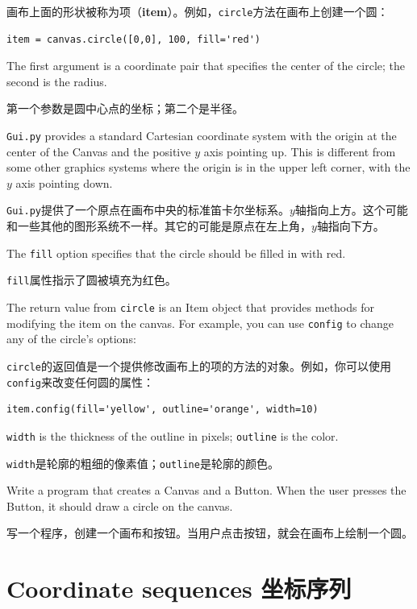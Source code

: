 \documentclass[10pt]{book}
\begin{document}
\begin{CJK}{UTF8}{gbsn}
画布上面的形状被称为项（{\bf item}）。例如，{\tt circle}方法在画布上创建一个圆：

\begin{verbatim}
item = canvas.circle([0,0], 100, fill='red')
\end{verbatim}
%
The first argument is a coordinate pair that specifies the
center of the circle; the second is the radius.

第一个参数是圆中心点的坐标；第二个是半径。

{\tt Gui.py} provides a standard Cartesian coordinate system with
the origin at the center of the Canvas and the positive $y$ axis
pointing up.  This is different from some other graphics systems
where the origin is in the upper left corner, with the $y$ axis
pointing down.

{\tt Gui.py}提供了一个原点在画布中央的标准笛卡尔坐标系。$y$轴指向上方。这个可能
和一些其他的图形系统不一样。其它的可能是原点在左上角，$y$轴指向下方。

The {\tt fill} option specifies that the circle should be filled
in with red.

{\tt fill}属性指示了圆被填充为红色。

The return value from {\tt circle} is an Item object that
provides methods for modifying the item on the canvas.  For
example, you can use {\tt config} to change any of the circle's
options:

{\tt circle}的返回值是一个提供修改画布上的项的方法的对象。例如，你可以使用{\tt
config}来改变任何圆的属性：

\begin{verbatim}
item.config(fill='yellow', outline='orange', width=10)
\end{verbatim}
%
{\tt width} is the thickness of the outline in pixels;
{\tt outline} is the color.

{\tt width}是轮廓的粗细的像素值；{\tt outline}是轮廓的颜色。

\begin{exercise}
\label{circle}

Write a program that creates a Canvas and a Button.  When the
user presses the Button, it should draw a circle on the canvas.

写一个程序，创建一个画布和按钮。当用户点击按钮，就会在画布上绘制一个圆。

\end{exercise}


\section{Coordinate sequences 坐标序列}


\end{CJK}
\end{document}
